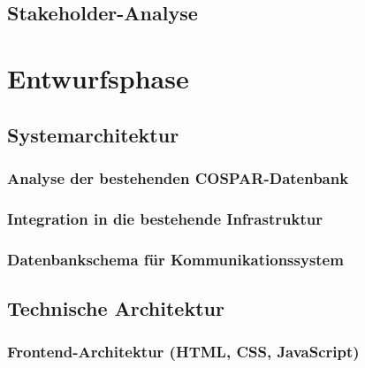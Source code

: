 \documentclass[11pt,a4paper]{article}
\begin{document}
\subsection{Stakeholder-Analyse}

\newpage
\section{Entwurfsphase}

\subsection{Systemarchitektur}

\subsubsection{Analyse der bestehenden COSPAR-Datenbank}

\subsubsection{Integration in die bestehende Infrastruktur}

\subsubsection{Datenbankschema für Kommunikationssystem}

\subsection{Technische Architektur}

\subsubsection{Frontend-Architektur (HTML, CSS, JavaScript)}
\end{document}
